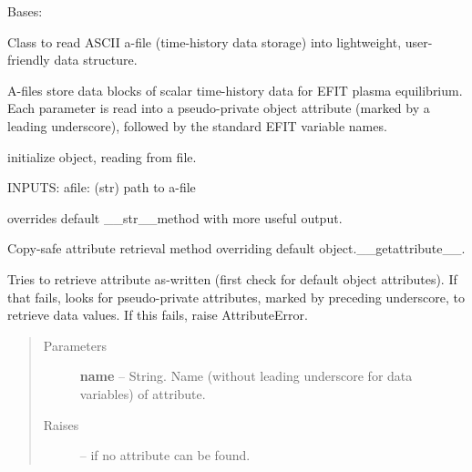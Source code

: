 \documentclass[letterpaper,10pt,english]{sphinxmanual}
\begin{document}
\begin{fulllineitems}
\label{eqtools:eqtools.afilereader.AFileReader}
Bases: 

Class to read ASCII a-file (time-history data storage) into lightweight, user-friendly data structure.

A-files store data blocks of scalar time-history data for EFIT plasma equilibrium.  Each parameter is
read into a pseudo-private object attribute (marked by a leading underscore), followed by the standard
EFIT variable names.

initialize object, reading from file.

INPUTS:
afile: (str) path to a-file

\begin{fulllineitems}
\label{eqtools:eqtools.afilereader.AFileReader.__str__}
overrides default \_\_str\_\_method with more useful output.

\end{fulllineitems}


\begin{fulllineitems}
\label{eqtools:eqtools.afilereader.AFileReader.__getattribute__}
Copy-safe attribute retrieval method overriding default object.\_\_getattribute\_\_.

Tries to retrieve attribute as-written (first check for default object attributes).
If that fails, looks for pseudo-private attributes, marked by preceding underscore,
to retrieve data values.  If this fails, raise AttributeError.
\begin{quote}\begin{description}
\item[{Parameters }] \leavevmode
\textbf{name} --
String.  Name (without leading underscore for data variables) of attribute.

\item[{Raises }] \leavevmode
{} -- 
if no attribute can be found.

\end{description}\end{quote}


\end{fulllineitems}
\end{fulllineitems}
\end{document}

